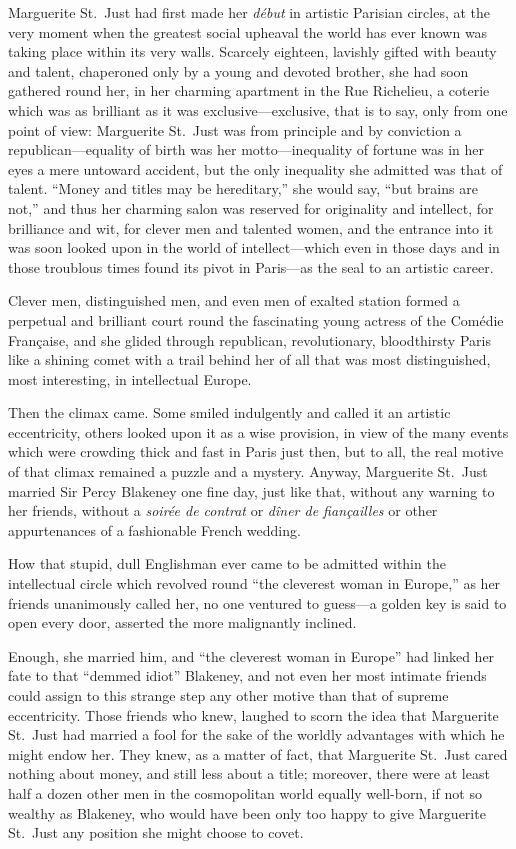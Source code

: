 \documentclass[paper=5.5in:8.5in,BCOR=7mm,twoside,DIV=calc,12pt,usegeometry,chapterprefix,endperiod,headings=big]{scrbook}
\begin{document}
Marguerite St.~Just had first made her \textit{début} in artistic Parisian circles, at the very moment when the greatest social upheaval the world has ever known was taking place within its very walls. Scarcely eighteen, lavishly gifted with beauty and talent, chaperoned only by a young and devoted brother, she had soon gathered round her, in her charming apartment in the Rue Richelieu, a coterie which was as brilliant as it was exclusive---exclusive, that is to say, only from one point of view: Marguerite St.~Just was from principle and by conviction a republican---equality of birth was her motto---inequality of fortune was in her eyes a mere untoward accident, but the only inequality she admitted was that of talent. \enquote{Money and titles may be hereditary,} she would say, \enquote{but brains are not,} and thus her charming salon was reserved for originality and intellect, for brilliance and wit, for clever men and talented women, and the entrance into it was soon looked upon in the world of intellect---which even in those days and in those troublous times found its pivot in Paris---as the seal to an artistic career.

Clever men, distinguished men, and even men of exalted station formed a perpetual and brilliant court round the fascinating young actress of the Comédie Française, and she glided through republican, revolutionary, bloodthirsty Paris like a shining comet with a trail behind her of all that was most distinguished, most interesting, in intellectual Europe.

Then the climax came. Some smiled indulgently and called it an artistic eccentricity, others looked upon it as a wise provision, in view of the many events which were crowding thick and fast in Paris just then, but to all, the real motive of that climax remained a puzzle and a mystery. Anyway, Marguerite St.~Just married Sir Percy Blakeney one fine day, just like that, without any warning to her friends, without a \textit{soirée de contrat} or \textit{dîner de fiançailles} or other appurtenances of a fashionable French wedding.

How that stupid, dull Englishman ever came to be admitted within the intellectual circle which revolved round \enquote{the cleverest woman in Europe,} as her friends unanimously called her, no one ventured to guess---a golden key is said to open every door, asserted the more malignantly inclined.

Enough, she married him, and \enquote{the cleverest woman in Europe} had linked her fate to that \enquote{demmed idiot} Blakeney, and not even her most intimate friends could assign to this strange step any other motive than that of supreme eccentricity. Those friends who knew, laughed to scorn the idea that Marguerite St.~Just had married a fool for the sake of the worldly advantages with which he might endow her. They knew, as a matter of fact, that Marguerite St.~Just cared nothing about money, and still less about a title; moreover, there were at least half a dozen other men in the cosmopolitan world equally well-born, if not so wealthy as Blakeney, who would have been only too happy to give Marguerite St.~Just any position she might choose to covet.
\end{document}
